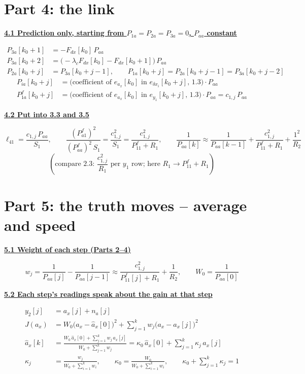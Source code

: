 \documentclass[11pt,a4paper]{ctexart}
\newcommand{\lc}{\lambda_c}
\newcommand{\hd}[1]{\par\medskip\noindent\underline{\textbf{#1}}\par\nobreak\vspace{0.2ex}}
\begin{document}
\section{Part 4: the link}

\hd{4.1 Prediction only, starting from $P_{1a} = P_{2a} = P_{3a} = 0$, $P_{aa}$ constant}
\[
\begin{aligned}
P_{3a}[k_0+1] &= -F_{dx}[k_0]\,P_{aa} \\
P_{3a}[k_0+2] &= \big(-\lc F_{dx}[k_0] - F_{dx}[k_0+1]\big)\,P_{aa} \\
P_{2a}[k_0+j] &= P_{3a}[k_0+j-1], \qquad P_{1a}[k_0+j] = P_{2a}[k_0+j-1] = P_{3a}[k_0+j-2]
\end{aligned}
\]
\[
\begin{aligned}
P_{ia}[k_0+j] &= \big(\text{coefficient of } e_{a_x}[k_0] \text{ in } e_{\delta x_i}[k_0+j]\text{, 1.3}\big)\cdot P_{aa} \\
P^f_{1a}[k_0+j] &= \big(\text{coefficient of } e_{a_x}[k_0] \text{ in } e_{y_1}[k_0+j]\text{, 1.3}\big)\cdot P_{aa} = c_{1,j}\,P_{aa}
\end{aligned}
\]

\hd{4.2 Put into 3.3 and 3.5}
\[
\ell_{41} = \frac{c_{1,j}\,P_{aa}}{S_1}, \qquad
\frac{(P^f_{a1})^2}{(P^f_{aa})^2\,S_1} = \frac{c_{1,j}^2}{S_1} = \frac{c_{1,j}^2}{P^f_{11} + R_1}, \qquad
\frac{1}{P_{aa}[k]} \approx \frac{1}{P_{aa}[k-1]} + \frac{c_{1,j}^2}{P^f_{11} + R_1} + \frac{1^2}{R_2}
\]
\[
(\text{compare 2.3: } \dfrac{c_{1,j}^2}{R_1} \text{ per } y_1 \text{ row; here } R_1 \to P^f_{11} + R_1)
\]


\clearpage
\section{Part 5: the truth moves -- average and speed}

\hd{5.1 Weight of each step (Parts 2--4)}
\[
w_j = \frac{1}{P_{aa}[j]} - \frac{1}{P_{aa}[j-1]} \approx \frac{c_{1,j}^2}{P^f_{11}[j] + R_1} + \frac{1}{R_2}, \qquad
W_0 = \frac{1}{P_{aa}[0]}
\]

\hd{5.2 Each step's readings speak about the gain at that step}
\[
\begin{aligned}
y_2[j] &= a_x[j] + n_a[j] \\
J(a_x) &= W_0\big(a_x - \hat a_x[0]\big)^2 + \sum_{j=1}^{k} w_j\big(a_x - a_x[j]\big)^2 \\
\hat a_x[k] &= \frac{W_0\,\hat a_x[0] + \sum_{j=1}^{k} w_j\,a_x[j]}{W_0 + \sum_{j=1}^{k} w_j}
= \kappa_0\,\hat a_x[0] + \sum_{j=1}^{k}\kappa_j\,a_x[j] \\
\kappa_j &= \frac{w_j}{W_0 + \sum_{i=1}^{k} w_i}, \qquad \kappa_0 = \frac{W_0}{W_0 + \sum_{i=1}^{k} w_i}, \qquad \kappa_0 + \sum_{j=1}^{k}\kappa_j = 1
\end{aligned}
\]
\end{document}
